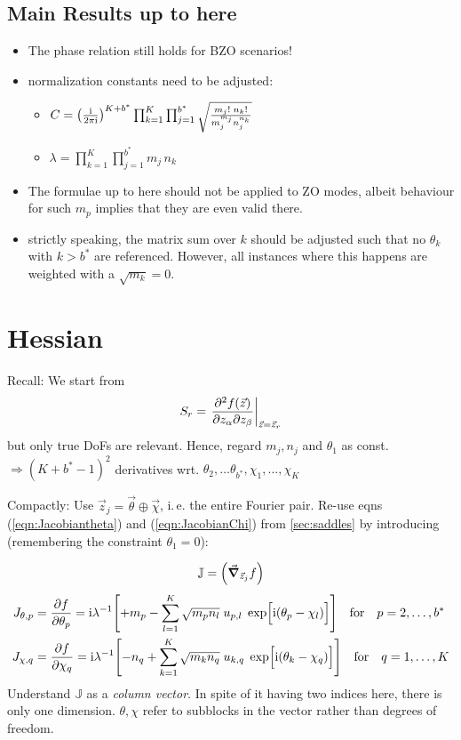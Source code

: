 \documentclass[
	english,
	a4paper,
	fontsize=10pt,
	parskip=half,
	titlepage=true,
	DIV=12,
	final
]{scrreprt}
\newcommand*{\ie}{i.\,e.\xspace}
\newcommand*{\Thus}{\ensuremath{\Rightarrow}\xspace}
\newcommand*{\iunit}{\ensuremath{\mathrm{i}}}
\begin{document}
\subsection{Main Results up to here}
\begin{itemize}
\item The phase relation still holds for BZO scenarios!
\item normalization constants need to be adjusted:
	\begin{itemize}
	\item $C =
	\qty(
		\frac{\iunit}{2\pi\iunit}
	)^{K + b^*}
	\prod_{k=1}^{K}
	\prod_{j=1}^{b^*}
		\sqrt{\frac
			{m_j! \; n_k!}
			{m_j^{m_j}  n_j^{n_k}}
		}$
	\item $\lambda =
	\prod_{k=1}^{K}
	\prod_{j=1}^{b^*}
		m_j \, n_k$
	\end{itemize}
\item The formulae up to here should not be applied to ZO modes, albeit behaviour for such $m_p$
	implies that they are even valid there.
\item strictly speaking, the matrix sum over $k$ should be adjusted such that no $\theta_k$ with
	$k > b^*$ are referenced. However, all instances where this happens are weighted with a
	$\sqrt{m_k} = 0$.
\end{itemize}

\section{Hessian}
Recall: We start from
\begin{align}
	S_r
=
	\eval{
		\pdv{f(\vec{z})}%
			{z_\alpha}{z_\beta}
	}_{\vec{z} = \vec{z}_r}
\end{align}
but only true DoFs are relevant. Hence, regard $m_j, n_j$ and $\theta_1$ as const. \\
\Thus $(K + b^* - 1)^{2}$ derivatives wrt. $\theta_2, \ldots \theta_{b^*}, \chi_1, \ldots, \chi_K$

Compactly: Use $\vec{z}_j = \vec{\theta} \oplus \vec{\chi}$, \ie the entire Fourier pair. Re-use eqns (\ref{eqn:Jacobiantheta}) and (\ref{eqn:JacobianChi}) from \ref{sec:saddles} by introducing (remembering the constraint $\theta_1 = 0$):

\begin{align}
	\mathbb{J} = \qty( \grad_{\vec{z}_j} f )
\end{align}
\begin{align}
	J_{\theta, p} 
&= 
	\pdv{f}{\theta_p}
=
	\iunit \lambda^{-1}
	\qty[
		+m_p
		-
		\sum_{l=1}^{K}
			\sqrt{m_p n_l} \; u_{p,l} \; \exp[\Big. \iunit(\theta_p - \chi_l)]
	]
\qfor{} p = 2, \ldots, b^*
\\
	J_{\chi, q} 
&= 
	\pdv{f}{\chi_q}
=
	\iunit \lambda^{-1}
	\qty[
		-n_q
		+
		\sum_{k=1}^{K}
			\sqrt{m_k n_q} \; u_{k,q} \; \exp[\Big. \iunit(\theta_k - \chi_q)]
	]
\qfor{} q = 1, \ldots, K
\end{align}
Understand $\mathbb{J}$ as a \emph{column vector}. In spite of it having two indices here, there is only one dimension. $\theta, \chi$ refer to subblocks in the vector rather than degrees of freedom.
\end{document}
